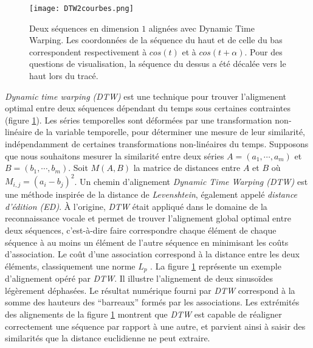 \begin{figure}[htb!] 
\centering
\texttt{[image: DTW2courbes.png]}
\caption{Deux s\'equences en dimension $1$ align\'ees avec Dynamic Time Warping. Les coordonn\'ees de la s\'equence du haut et de celle du bas correspondent respectivement \`a
$cos(t)$ et \`a $cos(t+\alpha)$. 
Pour des questions de visualisation, la s\'equence du dessus a \'et\'e d\'ecal\'ee vers le haut lors du trac\'e. \cite{petitjean2011descriptionDTWexemple}
}
\label{DTW2courbes}
\end{figure}

{\em Dynamic time warping (DTW) } \cite{muller2007dynamicDTW} est une technique pour trouver l'aligmenent optimal entre deux s\'equences d\'ependant du temps sous certaines contraintes (figure \ref{DTW2courbes}). 
Les s\'eries temporelles sont d\'eform\'ees par une transformation non-lin\'eaire de la variable temporelle, pour d\'eterminer une mesure de leur similarit\'e, ind\'ependamment de certaines transformations non-lin\'eaires du temps.
\newline
Supposons que nous souhaitons mesurer la similarit\'e entre deux s\'eries $A = (a_1, \cdots, a_m)$ et $B = (b_1, \cdots, b_m)$.
Soit $M(A,B)$ la matrice de distances entre $A$ et $B$ o\`u $M_{i,j} = (a_i - b_j)^2$.
Un chemin d'alignement {\em Dynamic Time Warping (DTW)} est une m\'ethode inspir\'ee de la distance de {\em Levenshtein}, \'egalement appel\'e {\em distance d'\'edition (ED)}. \`A l'origine, {\em DTW} \'etait appliqu\'e  dans le domaine de la reconnaissance vocale et permet de trouver l'alignement global optimal entre deux s\'equences, c'est-\`a-dire faire correspondre chaque \'el\'ement de chaque s\'equence \`a au moins un \'el\'ement de l'autre s\'equence en minimisant les co\^uts d'association. 
Le co\^ut d'une association correspond \`a la distance entre les deux \'el\'ements, classiquement une  norme $L_p$ \cite{chen2004marriageLpNorm}.
La figure \ref{DTW2courbes} repr\'esente un exemple d'alignement op\'er\'e par {\em DTW}.
Il illustre l'alignement de deux sinuso\"{i}des l\'eg\`erement d\'ephas\'ees. Le r\'esultat num\'erique fourni par {\em DTW} correspond \`a la somme des hauteurs des ``barreaux'' form\'es par les associations. Les extr\'emit\'es des alignements de la figure \ref{DTW2courbes} montrent que {\em DTW} est capable de r\'ealigner correctement une s\'equence par rapport \`a une autre, et parvient ainsi \`a saisir des similarit\'es que la
distance euclidienne ne peut extraire.
\newline
